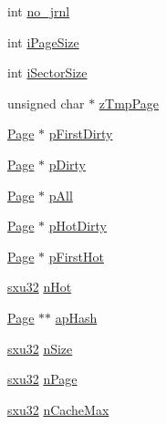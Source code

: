 \begin{DoxyCompactItemize}
int \hyperlink{struct_pager_ae2ed5580d49398d50b6056e312b54f38}{no\-\_\-jrnl}
\item 
int \hyperlink{struct_pager_abc9d2e0553fbd9522b7a72c86907a27e}{i\-Page\-Size}
\item 
int \hyperlink{struct_pager_a9df9e15999f3ae2b1e0b4bdb17b3ca5a}{i\-Sector\-Size}
\item 
unsigned char $\ast$ \hyperlink{struct_pager_a77f5ef394dfa4ff278fe9d92ac99aad1}{z\-Tmp\-Page}
\item 
\hyperlink{struct_page}{Page} $\ast$ \hyperlink{struct_pager_ac41e458347960984b334872da9fec643}{p\-First\-Dirty}
\item 
\hyperlink{struct_page}{Page} $\ast$ \hyperlink{struct_pager_a231678876b528b2055a42890c3cb0d91}{p\-Dirty}
\item 
\hyperlink{struct_page}{Page} $\ast$ \hyperlink{struct_pager_afecdc15faa1fabedeadc8e0b28be03b4}{p\-All}
\item 
\hyperlink{struct_page}{Page} $\ast$ \hyperlink{struct_pager_a9f0232f98b16b34e6185364b7a0471db}{p\-Hot\-Dirty}
\item 
\hyperlink{struct_page}{Page} $\ast$ \hyperlink{struct_pager_a87774cbfe79b882a6bc043ded5111c94}{p\-First\-Hot}
\item 
\hyperlink{unqlite_8c_abc5a8a3f345c200c98c485551f49666e}{sxu32} \hyperlink{struct_pager_a15b3dbd86c42f44d1c62e7a082a19c75}{n\-Hot}
\item 
\hyperlink{struct_page}{Page} $\ast$$\ast$ \hyperlink{struct_pager_a6d78f3ba95ed2693c0e36fb8a979e2d1}{ap\-Hash}
\item 
\hyperlink{unqlite_8c_abc5a8a3f345c200c98c485551f49666e}{sxu32} \hyperlink{struct_pager_a5ca23b140ec442e4324a77ca9baac1f9}{n\-Size}
\item 
\hyperlink{unqlite_8c_abc5a8a3f345c200c98c485551f49666e}{sxu32} \hyperlink{struct_pager_a54a5b057e8b59f0030b6866aa98cb74b}{n\-Page}
\item 
\hyperlink{unqlite_8c_abc5a8a3f345c200c98c485551f49666e}{sxu32} \hyperlink{struct_pager_a610536072e95b06558413a9bea5a7875}{n\-Cache\-Max}
\end{DoxyCompactItemize}


